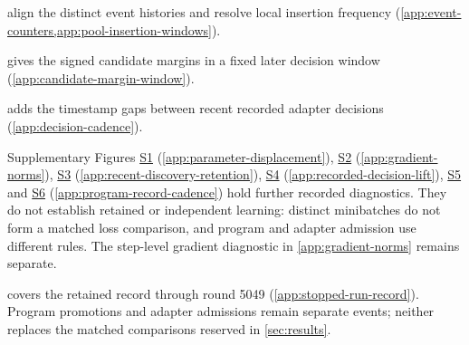 







 align the distinct event histories and resolve local insertion frequency (\cref{app:event-counters,app:pool-insertion-windows}).

 gives the signed candidate margins in a
fixed later decision window (\cref{app:candidate-margin-window}).

 adds the timestamp gaps between recent recorded
adapter decisions (\cref{app:decision-cadence}).

\begin{samepage}
Supplementary Figures
\href{eurekazero_supplement.pdf#supp-parameter-displacement}{S1} (\cref{app:parameter-displacement}),
\href{eurekazero_supplement.pdf#supp-training-minibatch-losses}{S2} (\ref{app:gradient-norms}),
\href{eurekazero_supplement.pdf#supp-recent-discovery-retention}{S3} (\ref{app:recent-discovery-retention}),
\href{eurekazero_supplement.pdf#supp-recorded-decision-lift}{S4} (\ref{app:recorded-decision-lift}),
\href{eurekazero_supplement.pdf#supp-program-record-cadence}{S5} and
\href{eurekazero_supplement.pdf#supp-program-record-windows}{S6} (\ref{app:program-record-cadence})
hold further recorded diagnostics.
They do not establish retained or independent learning:
distinct minibatches do not form a matched loss comparison, and program
and adapter admission use different rules. The step-level gradient
diagnostic in \cref{app:gradient-norms} remains separate.\par
\end{samepage}

 covers the retained record through round 5049
(\cref{app:stopped-run-record}). Program promotions and adapter
admissions remain separate events; neither replaces the matched comparisons
reserved in \cref{sec:results}.
